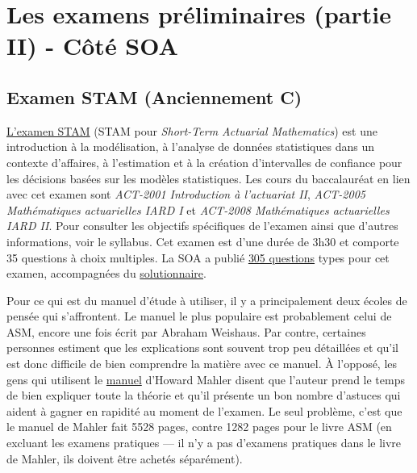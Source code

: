 \newpage




\section*{Les examens préliminaires (partie II) - Côté SOA}
\label{sec:prelimssuitesoa}

\subsection*{Examen STAM (Anciennement C)}
\label{subsec:examstam}
\href{https://www.soa.org/Education/Exam-Req/edu-exam-stam-detail.aspx}{L'examen STAM} (STAM pour \textit{Short-Term Actuarial Mathematics}) est une introduction à la modélisation, à l'analyse de données statistiques dans un contexte d'affaires, à l'estimation et à la création d'intervalles de confiance pour les décisions basées sur les modèles statistiques. Les cours du baccalauréat en lien avec cet examen sont \textit{ACT-2001 Introduction à l'actuariat II}, \textit{ACT-2005 Mathématiques actuarielles IARD I} et \textit{ACT-2008 Mathématiques actuarielles IARD II}. Pour consulter les objectifs spécifiques de l'examen ainsi que d'autres informations, voir le syllabus. Cet examen est d'une durée de 3h30 et comporte 35 questions à choix multiples. La SOA a publié \href{http://www.soa.org/files/edu/edu-exam-c-sample-quest.pdf}{305 questions} types pour cet examen, accompagnées du \href{http://www.soa.org/files/edu/edu-exam-c-sample-sol.pdf}{solutionnaire}.\vspace{\baselineskip}

Pour ce qui est du manuel d'étude à utiliser, il y a principalement deux écoles de pensée qui s'affrontent. Le manuel le plus populaire est probablement celui de ASM, encore une fois écrit par Abraham Weishaus. Par contre, certaines personnes estiment que les explications sont souvent trop peu détaillées et qu'il est donc difficile de bien comprendre la matière avec ce manuel. À l'opposé, les gens qui utilisent le \href{http://howardmahler.com/Teaching/C.html}{manuel} d'Howard Mahler disent que l'auteur prend le temps de bien expliquer toute la théorie et qu'il présente un bon nombre d'astuces qui aident à gagner en rapidité au moment de l'examen. Le seul problème, c'est que le manuel de Mahler fait 5528 pages, contre 1282 pages pour le livre ASM (en excluant les examens pratiques --- il n'y a pas d'examens pratiques dans le livre de Mahler, ils doivent être achetés séparément). \vspace{\baselineskip}


